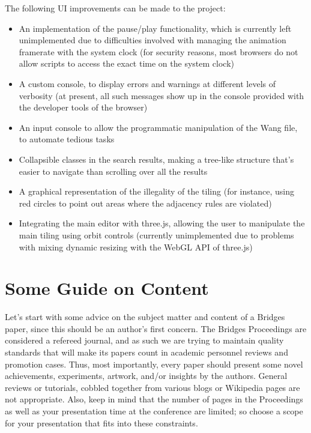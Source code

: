 \documentclass[letterpaper,11pt]{article}
\begin{document}
The following UI improvements can be made to the project:

\begin{itemize}
	\item An implementation of the pause/play functionality, which is currently left unimplemented due to difficulties involved with managing the animation framerate with the system clock (for security reasons, most browsers do not allow scripts to access the exact time on the system clock)
	\item A custom console, to display errors and warnings at different levels of verbosity (at present, all such messages show up in the console provided with the developer tools of the browser)
	\item An input console to allow the programmatic manipulation of the Wang file, to automate tedious tasks
	\item Collapsible classes in the search results, making a tree-like structure that's easier to navigate than scrolling over all the results
	\item A graphical representation of the illegality of the tiling (for instance, using red circles to point out areas where the adjacency rules are violated)
	\item Integrating the main editor with three.js, allowing the user to manipulate the main tiling using orbit controls (currently unimplemented due to problems with mixing dynamic resizing with the WebGL API of three.js)
\end{itemize}

\section*{Some Guide on Content}


Let's start with some advice on the subject matter and content of a
Bridges paper, since this should be an author's first concern. The
Bridges Proceedings are considered a refereed journal, and as such we
are trying to maintain quality standards that will make its papers count
in academic personnel reviews and promotion cases. Thus, most
importantly, every paper should present some novel achievements,
experiments, artwork, and/or insights by the authors. General reviews or
tutorials, cobbled together from various blogs or Wikipedia pages are
not appropriate. Also, keep in mind that the number of pages in the
Proceedings as well as your presentation time at the conference are
limited; so choose a scope for your presentation that fits into these
constraints.
\end{document}
